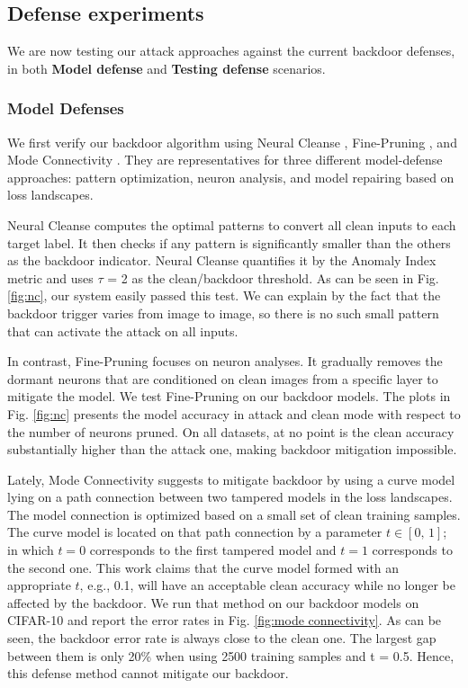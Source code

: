\subsection{Defense experiments}
We are now testing our attack approaches against the current backdoor defenses, in both {\bfseries Model defense} and {\bfseries Testing defense} scenarios. 

\subsubsection{Model Defenses}
We first verify our backdoor algorithm using Neural Cleanse \cite{wang2019neural}, Fine-Pruning \cite{liu2018fine}, and Mode Connectivity \cite{zhao2020bridging}. They are representatives for three different model-defense approaches: pattern optimization, neuron analysis, and model repairing based on loss landscapes.

Neural Cleanse computes the optimal patterns to convert all clean inputs to each target label. It then checks if any pattern is significantly smaller than the others as the backdoor indicator. Neural Cleanse quantifies it by the Anomaly Index metric and uses $\tau$ = 2 as the clean/backdoor threshold. As can be seen in Fig.  \ref{fig:nc}, our system easily passed this test. We can explain by the fact that the backdoor trigger varies from image to image, so there is no such small pattern that can activate the attack on all inputs. 


In contrast, Fine-Pruning focuses on neuron analyses. It gradually removes the dormant neurons that are conditioned on clean images from a specific layer to mitigate the model. We test Fine-Pruning on our backdoor models. The plots in Fig. \ref{fig:nc} presents the model accuracy in attack and clean mode with respect to the number of neurons pruned. On all datasets, at no point is the clean accuracy substantially higher than the attack one, making backdoor mitigation impossible.

Lately, Mode Connectivity suggests to mitigate backdoor by using a curve model lying on a path connection between two tampered models in the loss landscapes. The model connection is optimized based on a small set of clean training samples. The curve model is located on that path connection by a parameter $t \in [0,\,1]$; in which $t=0$ corresponds to the first tampered model and $t=1$ corresponds to the second one. This work claims that the curve model formed with an appropriate $t$, e.g., 0.1, will have an acceptable clean accuracy while no longer be affected by the backdoor. We run that method on our backdoor models on CIFAR-10 and report the error rates in Fig. \ref{fig:mode connectivity}. As can be seen, the backdoor error rate is always close to the clean one. The largest gap between them is only 20\% when using 2500 training samples and t = 0.5. Hence, this defense method cannot mitigate our backdoor.

